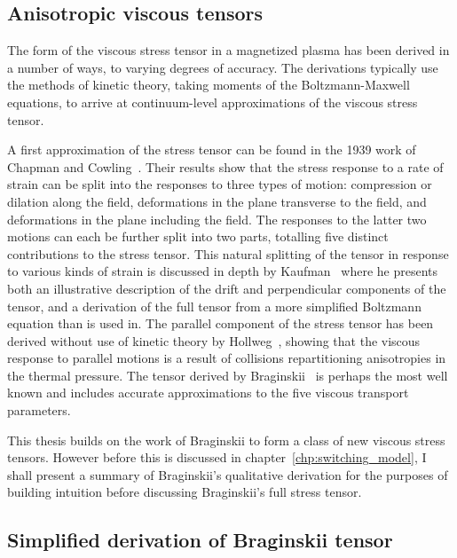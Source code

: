 \subsection{Anisotropic viscous tensors}

The form of the viscous stress tensor in a magnetized plasma has been derived in a number of ways, to varying degrees of accuracy. The derivations typically use the methods of kinetic theory, taking moments of the Boltzmann-Maxwell equations, to arrive at continuum-level approximations of the viscous stress tensor.

A first approximation of the stress tensor can be found in the 1939 work of Chapman and Cowling~\cite{chapmanMathematicalTheoryNonuniform1970}. Their results show that the stress response to a rate of strain can be split into the responses to three types of motion: compression or dilation along the field, deformations in the plane transverse to the field, and deformations in the plane including the field. The responses to the latter two motions can each be further split into two parts, totalling five distinct contributions to the stress tensor. This natural splitting of the tensor in response to various kinds of strain is discussed in depth by Kaufman~\cite{kaufmanPlasmaViscosityMagnetic1960} where he presents both an illustrative description of the drift and perpendicular components of the tensor, and a derivation of the full tensor from a more simplified Boltzmann equation than is used in\cite{chapmanMathematicalTheoryNonuniform1970}. The parallel component of the stress tensor has been derived without use of kinetic theory by Hollweg~\cite{hollwegViscosityMagnetizedPlasma1985}, showing that the viscous response to parallel motions is a result of collisions repartitioning anisotropies in the thermal pressure. The tensor derived by Braginskii~\cite{braginskiiTransportProcessesPlasma1965} is perhaps the most well known and includes accurate approximations to the five viscous transport parameters.

This thesis builds on the work of Braginskii to form a class of new viscous stress tensors. However before this is discussed in chapter~\ref{chp:switching_model}, I shall present a summary of Braginskii's qualitative derivation for the purposes of building intuition before discussing Braginskii's full stress tensor.

\subsection{Simplified derivation of Braginskii tensor}

